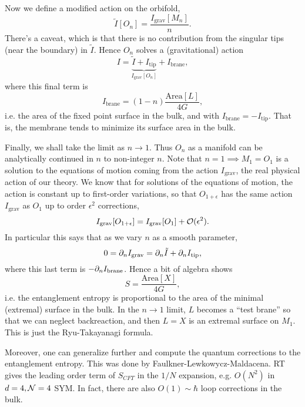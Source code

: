 Now we define a modified action on the orbifold,
\begin{equation}
    \tilde I[O_n]=\frac{I_\text{grav}[M_n]}{n}.
\end{equation}
There's a caveat, which is that there is no contribution from the singular tips (near the boundary) in $\tilde I$. Hence $O_n$ solves a (gravitational) action
\begin{equation}
    I=\underbrace{\tilde I+I_\text{tip}}_{I_\text{grav}[O_n]}+ I_\text{brane},
\end{equation}
where this final term is
\begin{equation}
    I_\text{brane}=(1-n)\frac{\text{Area}[L]}{4G},
\end{equation}
i.e. the area of the fixed point surface in the bulk, and with $I_\text{brane}=-I_\text{tip}$. That is, the membrane tends to minimize its surface area in the bulk.

Finally, we shall take the limit as $n\to 1$. Thus $O_n$ as a manifold can be analytically continued in $n$ to non-integer $n$. Note that $n=1\implies M_1=O_1$ is a solution to the equations of motion coming from the action $I_\text{grav}$, the real physical action of our theory. We know that for solutions of the equations of motion, the action is constant up to first-order variations, so that $O_{1+\epsilon}$ has the same action $I_\text{grav}$ as $O_1$ up to order $\epsilon^2$ corrections,
\begin{equation}
    I_\text{grav}[O_{1+\epsilon}]=I_\text{grav}[O_1]+\mathcal O(\epsilon^2).
\end{equation}
In particular this says that as we vary $n$ as a smooth parameter,
\begin{equation}
    0=\partial_n I_\text{grav}=\partial_n \tilde I + \partial_n I_\text{tip},
\end{equation}
where this last term is $-\partial_n I_\text{brane}$. Hence a bit of algebra shows
\begin{equation}
    S=\frac{\text{Area}[X]}{4G},
\end{equation}
i.e. the entanglement entropy is proportional to the area of the minimal (extremal) surface in the bulk. In the $n\to 1$ limit, $L$ becomes a ``test brane'' so that we can neglect backreaction, and then $L=X$ is an extremal surface on $M_1$. This is just the Ryu-Takayanagi formula.

Moreover, one can generalize further and compute the quantum corrections to the entanglement entropy. This was done by Faulkner-Lewkowycz-Maldacena. RT gives the leading order term of $S_{CFT}$ in the $1/N$ expansion, e.g. $O(N^2)$ in $d=4,\mathcal N=4$ SYM. In fact, there are also $O(1)\sim \hbar$ loop corrections in the bulk.

